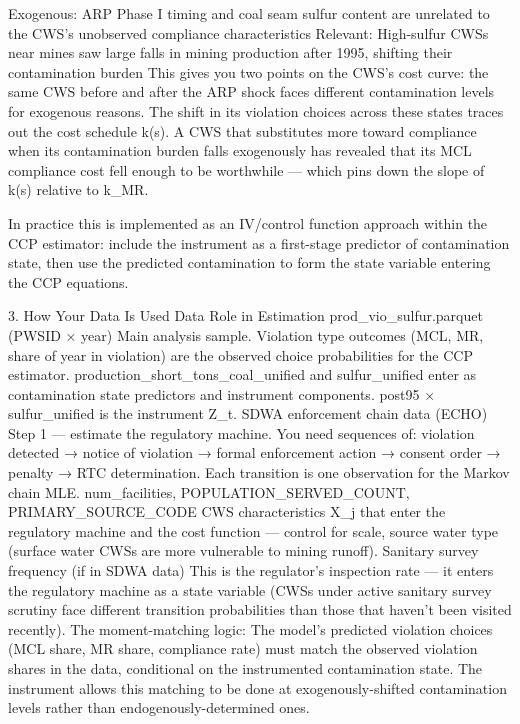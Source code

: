 Exogenous: ARP Phase I timing and coal seam sulfur content are unrelated to the CWS's unobserved compliance characteristics
Relevant: High-sulfur CWSs near mines saw large falls in mining production after 1995, shifting their contamination burden
This gives you two points on the CWS's cost curve: the same CWS before and after the ARP shock faces different contamination levels for exogenous reasons. The shift in its violation choices across these states traces out the cost schedule k(s). A CWS that substitutes more toward compliance when its contamination burden falls exogenously has revealed that its MCL compliance cost fell enough to be worthwhile — which pins down the slope of k(s) relative to k_MR.

In practice this is implemented as an IV/control function approach within the CCP estimator: include the instrument as a first-stage predictor of contamination state, then use the predicted contamination to form the state variable entering the CCP equations.

3. How Your Data Is Used
Data	Role in Estimation
prod_vio_sulfur.parquet (PWSID × year)	Main analysis sample. Violation type outcomes (MCL, MR, share of year in violation) are the observed choice probabilities for the CCP estimator. production_short_tons_coal_unified and sulfur_unified enter as contamination state predictors and instrument components. post95 × sulfur_unified is the instrument Z_t.
SDWA enforcement chain data (ECHO)	Step 1 — estimate the regulatory machine. You need sequences of: violation detected → notice of violation → formal enforcement action → consent order → penalty → RTC determination. Each transition is one observation for the Markov chain MLE.
num_facilities, POPULATION_SERVED_COUNT, PRIMARY_SOURCE_CODE	CWS characteristics X_j that enter the regulatory machine and the cost function — control for scale, source water type (surface water CWSs are more vulnerable to mining runoff).
Sanitary survey frequency (if in SDWA data)	This is the regulator's inspection rate — it enters the regulatory machine as a state variable (CWSs under active sanitary survey scrutiny face different transition probabilities than those that haven't been visited recently).
The moment-matching logic: The model's predicted violation choices (MCL share, MR share, compliance rate) must match the observed violation shares in the data, conditional on the instrumented contamination state. The instrument allows this matching to be done at exogenously-shifted contamination levels rather than endogenously-determined ones.

